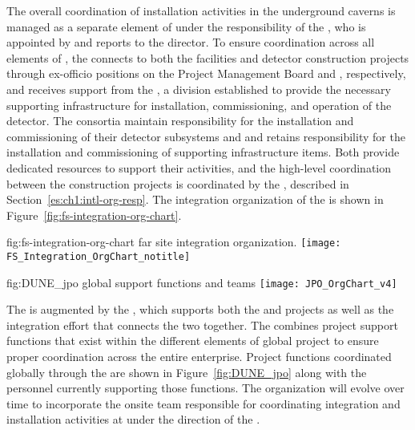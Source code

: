 The overall
coordination of installation activities in the underground caverns 
is managed as a separate element of  under the
responsibility of the , who is appointed by and reports
to the  director.  To ensure coordination across
all elements of , the  connects to both
the facilities and detector construction projects through ex-officio
positions on the  Project Management Board and
 , respectively, %
and receives support from the ,
a  division established to 
provide the necessary supporting infrastructure for installation, commissioning, and operation 
of the  detector.
The  consortia maintain responsibility 
for the installation and commissioning of their detector subsystems
and %
and  retains responsibility
for the installation and commissioning of supporting infrastructure
items. 
Both provide dedicated resources to support their activities, and the high-level
coordination between the construction 
projects is coordinated by the , described in Section~\ref{es:ch1:intl-org-resp}.    
The 
 integration organization of the  is shown in Figure~\ref{fig:fs-integration-org-chart}. 

\begin{dunefigure}{fig:fs-integration-org-chart}
  { far site integration organization.}
  \texttt{[image: FS\_Integration\_OrgChart\_notitle]} %
\end{dunefigure}

\begin{dunefigure}{fig:DUNE_jpo}
  { global support functions and teams}
  \texttt{[image: JPO\_OrgChart\_v4]}
\end{dunefigure}

The  is augmented by the , which supports both 
the  and  projects as well as the integration
effort that connects the two together. The  combines
project support functions that exist within the different elements 
of global project to ensure proper coordination across the entire 
 enterprise.  Project functions coordinated globally 
through the  are shown in Figure~\ref{fig:DUNE_jpo} along 
with the personnel currently supporting those functions.
The  organization will evolve over time to incorporate the 
onsite team responsible for coordinating integration and installation 
activities at  under the direction of the .  %

